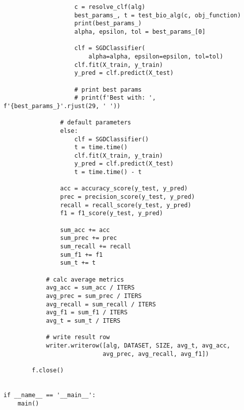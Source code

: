 \begin{lstlisting}
                    c = resolve_clf(alg)
                    best_params_, t = test_bio_alg(c, obj_function)
                    print(best_params_)
                    alpha, epsilon, tol = best_params_[0]

                    clf = SGDClassifier(
                        alpha=alpha, epsilon=epsilon, tol=tol)
                    clf.fit(X_train, y_train)
                    y_pred = clf.predict(X_test)

                    # print best params
                    # print(f'Best with: ', f'{best_params_}'.rjust(29, ' '))

                # default parameters
                else:
                    clf = SGDClassifier()
                    t = time.time()
                    clf.fit(X_train, y_train)
                    y_pred = clf.predict(X_test)
                    t = time.time() - t

                acc = accuracy_score(y_test, y_pred)
                prec = precision_score(y_test, y_pred)
                recall = recall_score(y_test, y_pred)
                f1 = f1_score(y_test, y_pred)

                sum_acc += acc
                sum_prec += prec
                sum_recall += recall
                sum_f1 += f1
                sum_t += t

            # calc average metrics
            avg_acc = sum_acc / ITERS
            avg_prec = sum_prec / ITERS
            avg_recall = sum_recall / ITERS
            avg_f1 = sum_f1 / ITERS
            avg_t = sum_t / ITERS

            # write result row
            writer.writerow([alg, DATASET, SIZE, avg_t, avg_acc,
                            avg_prec, avg_recall, avg_f1])

        f.close()


if __name__ == '__main__':
    main()    

\end{lstlisting}
